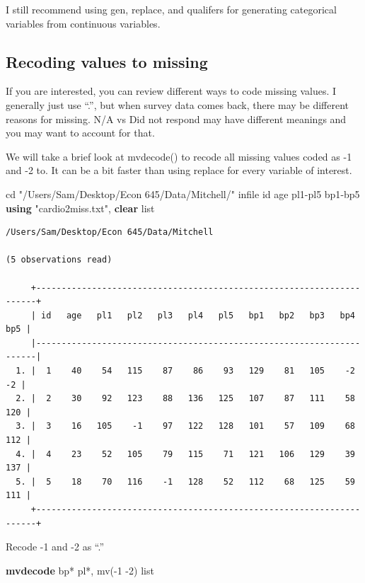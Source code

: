 \documentclass[
]{book}
\newenvironment{Shaded}{\begin{snugshade}}{\end{snugshade}}
\newcommand{\KeywordTok}[1]{\textcolor[rgb]{0.13,0.29,0.53}{\textbf{#1}}}
\newcommand{\NormalTok}[1]{#1}
\newcommand{\OtherTok}[1]{\textcolor[rgb]{0.56,0.35,0.01}{#1}}
\newcommand{\StringTok}[1]{\textcolor[rgb]{0.31,0.60,0.02}{#1}}
\begin{document}
I still recommend using gen, replace, and qualifers for generating categorical variables from continuous variables.

\subsection{Recoding values to missing}\label{recoding-values-to-missing}

If you are interested, you can review different ways to code missing values. I generally just use ``.'', but when survey data
comes back, there may be different reasons for missing. N/A vs Did not respond may have different meanings and you may
want to account for that.

We will take a brief look at mvdecode() to recode all missing values coded as -1 and -2 to. It can be a bit faster than using replace for every variable of interest.

\begin{Shaded}
\begin{Highlighting}[]
\NormalTok{cd }\StringTok{"/Users/Sam/Desktop/Econ 645/Data/Mitchell/"}
\NormalTok{infile id age pl1{-}pl5 bp1{-}bp5 }\KeywordTok{using} \StringTok{"cardio2miss.txt"}\NormalTok{, }\KeywordTok{clear}
\OtherTok{list}
\end{Highlighting}
\end{Shaded}

\begin{verbatim}
/Users/Sam/Desktop/Econ 645/Data/Mitchell

(5 observations read)

     +----------------------------------------------------------------------+
     | id   age   pl1   pl2   pl3   pl4   pl5   bp1   bp2   bp3   bp4   bp5 |
     |----------------------------------------------------------------------|
  1. |  1    40    54   115    87    86    93   129    81   105    -2    -2 |
  2. |  2    30    92   123    88   136   125   107    87   111    58   120 |
  3. |  3    16   105    -1    97   122   128   101    57   109    68   112 |
  4. |  4    23    52   105    79   115    71   121   106   129    39   137 |
  5. |  5    18    70   116    -1   128    52   112    68   125    59   111 |
     +----------------------------------------------------------------------+
\end{verbatim}

Recode -1 and -2 as ``.''

\begin{Shaded}
\begin{Highlighting}[]
\KeywordTok{mvdecode}\NormalTok{ bp* pl*, mv({-}1 {-}2)}
\OtherTok{list}
\end{Highlighting}
\end{Shaded}
\end{document}
